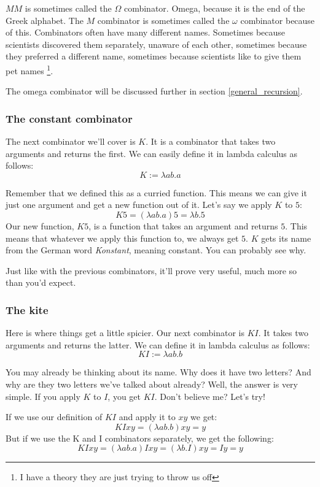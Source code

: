 \documentclass[11pt]{article}
\begin{document}
\(M M\) is sometimes called the \(\Omega\) combinator. Omega, because it is the
end of the Greek alphabet. The \(M\) combinator is sometimes called the
\(\omega\) combinator because of this. Combinators often have many different
names. Sometimes because scientists discovered them separately, unaware of each
other, sometimes because they preferred a different name, sometimes because
scientists like to give them pet names \footnote{I have a theory they are just
trying to throw us off}.

The omega combinator will be discussed further in section
\ref{general_recursion}.

\subsubsection{The constant combinator}\label{constant}

The next combinator we'll cover is \(K\). It is a combinator that takes two
arguments and returns the first. We can easily define it in lambda calculus as
follows:
\[K:=\lambda ab.a\]

Remember that we defined this as a curried function. This means we can give it
just one argument and get a new function out of it. Let's say we apply \(K\) to
\(5\):
\[K5=(\lambda ab.a)5=\lambda b.5\]
Our new function, \(K5\), is a function that takes an argument and returns
\(5\). This means that whatever we apply this function to, we always get \(5\).
\(K\) gets its name from the German word \emph{Konstant}, meaning constant. You
can probably see why.

Just like with the previous combinators, it'll prove very useful, much more so
than you'd expect.

\subsubsection{The kite}

Here is where things get a little spicier. Our next combinator is \(KI\). It
takes two arguments and returns the latter. We can define it in lambda calculus
as follows:
\[KI:=\lambda ab.b\]

You may already be thinking about its name. Why does it have two letters? And
why are they two letters we've talked about already? Well, the answer is very
simple. If you apply \(K\) to \(I\), you get \(KI\). Don't believe me? Let's
try!

If we use our definition of \(KI\) and apply it to \(xy\) we get:
\[KIxy=(\lambda ab.b)xy=y\]
But if we use the K and I combinators separately, we get the following:
\[KIxy=(\lambda ab.a)Ixy=(\lambda b.I)xy=Iy=y\]
\end{document}
